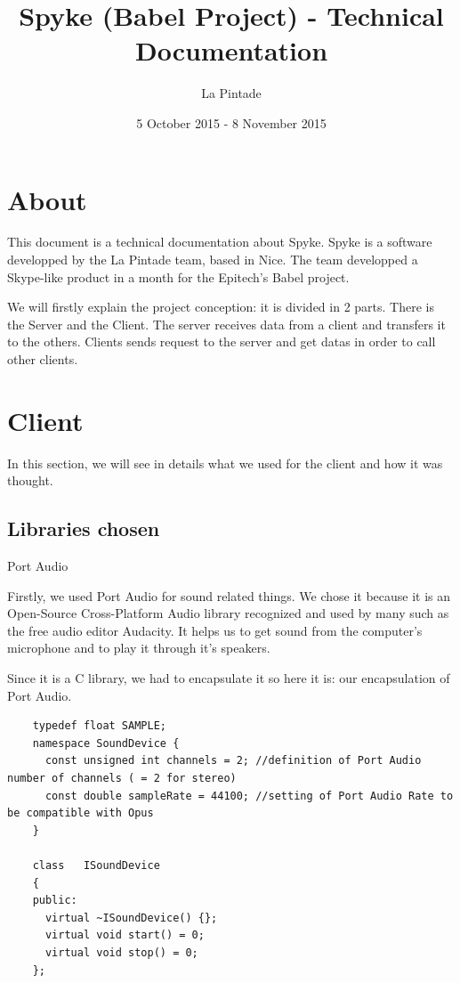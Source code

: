 \documentclass{article}
\title{Spyke (Babel Project) - Technical Documentation}
\author{La Pintade}
\date{5 October 2015 - 8 November 2015}
\begin{document}
  \maketitle
  \tableofcontents


  \newpage
  \section{About}
    This document is a technical documentation about Spyke.
    Spyke is a software developped by the La Pintade team, based in Nice.
    The team developped a Skype-like product in a month for the Epitech's Babel project.
 \bigskip

  We will firstly explain the project conception: it is divided in 2 parts. There is the Server and the Client. The server receives data from a client and transfers it to the others. Clients sends request to the server and get datas in order to call other clients.
  \newpage

  \section{Client}

  In this section, we will see in details what we used for the client and how it was thought.

  \subsection{Libraries chosen}

  \bigskip
  Port Audio
  \bigskip

  Firstly, we used Port Audio for sound related things. We chose it because it is an Open-Source Cross-Platform Audio library recognized and used by many such as the free audio editor Audacity. It helps us to get sound from the computer's microphone and to play it through it's speakers.

  \bigskip
  Since it is a C library, we had to encapsulate it so here it is: our encapsulation of Port Audio.
  \bigskip

  \begin{lstlisting}
    typedef float SAMPLE;
    namespace SoundDevice {
      const unsigned int channels = 2; //definition of Port Audio number of channels ( = 2 for stereo)
      const double sampleRate = 44100; //setting of Port Audio Rate to be compatible with Opus
    }

    class   ISoundDevice
    {
    public:
      virtual ~ISoundDevice() {};
      virtual void start() = 0;
      virtual void stop() = 0;
    };
  \end{lstlisting}
\end{document}
